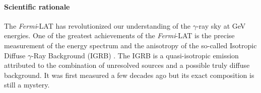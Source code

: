 \documentclass[12 pt]{article}
\date{}
\newcommand{\FIXME}[1]{{\color{red}{\em Comment: }{#1}}}
\begin{document}


\vspace{-2.0cm}
\paragraph{Scientific rationale}

The {\it Fermi}-LAT has revolutionized our understanding of the $\gamma$-ray sky at GeV energies.
One of the greatest achievements of the {\it Fermi}-LAT is the precise measurement of the energy spectrum and the anisotropy of the so-called Isotropic Diffuse $\gamma$-Ray Background (IGRB) \cite{Ackermann:2014usa,2012PhRvD..85h3007A}. 
The IGRB is a quasi-isotropic emission attributed to the combination of unresolved sources and a possible
truly diffuse background. It was first measured a few decades ago but its exact composition is still a mystery.
\end{document}
